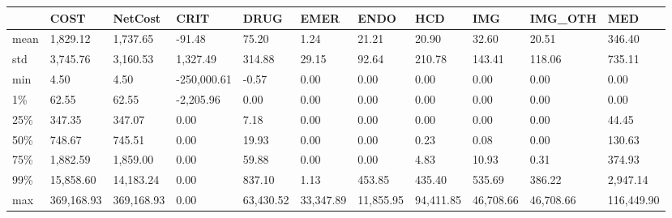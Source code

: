 \begin{tabular}{lllllllllll}
\toprule
{} &        COST &     NetCost &         CRIT &       DRUG &       EMER &       ENDO &        HCD &        IMG &    IMG\_OTH &         MED \\
\midrule
mean &    1,829.12 &    1,737.65 &       -91.48 &      75.20 &       1.24 &      21.21 &      20.90 &      32.60 &      20.51 &      346.40 \\
std  &    3,745.76 &    3,160.53 &     1,327.49 &     314.88 &      29.15 &      92.64 &     210.78 &     143.41 &     118.06 &      735.11 \\
min  &        4.50 &        4.50 &  -250,000.61 &      -0.57 &       0.00 &       0.00 &       0.00 &       0.00 &       0.00 &        0.00 \\
1\%   &       62.55 &       62.55 &    -2,205.96 &       0.00 &       0.00 &       0.00 &       0.00 &       0.00 &       0.00 &        0.00 \\
25\%  &      347.35 &      347.07 &         0.00 &       7.18 &       0.00 &       0.00 &       0.00 &       0.00 &       0.00 &       44.45 \\
50\%  &      748.67 &      745.51 &         0.00 &      19.93 &       0.00 &       0.00 &       0.23 &       0.08 &       0.00 &      130.63 \\
75\%  &    1,882.59 &    1,859.00 &         0.00 &      59.88 &       0.00 &       0.00 &       4.83 &      10.93 &       0.31 &      374.93 \\
99\%  &   15,858.60 &   14,183.24 &         0.00 &     837.10 &       1.13 &     453.85 &     435.40 &     535.69 &     386.22 &    2,947.14 \\
max  &  369,168.93 &  369,168.93 &         0.00 &  63,430.52 &  33,347.89 &  11,855.95 &  94,411.85 &  46,708.66 &  46,708.66 &  116,449.90 \\
\bottomrule
\end{tabular}
